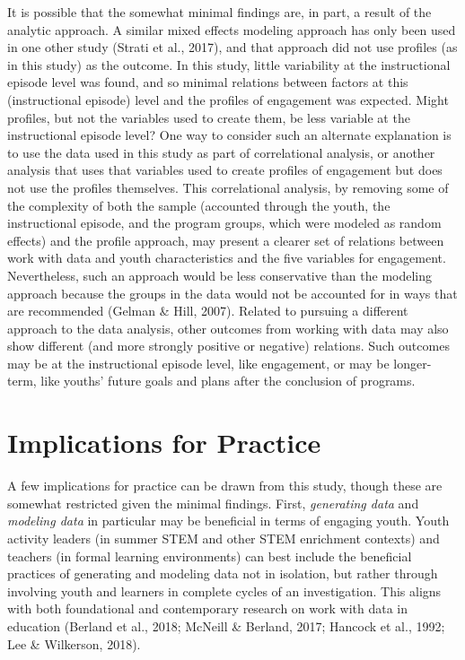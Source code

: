 \documentclass[]{book}
\theoremstyle{definition}
\theoremstyle{definition}
\theoremstyle{definition}
\theoremstyle{remark}
\begin{document}
It is possible that the somewhat minimal findings are, in part, a result
of the analytic approach. A similar mixed effects modeling approach has
only been used in one other study (Strati et al., 2017), and that
approach did not use profiles (as in this study) as the outcome. In this
study, little variability at the instructional episode level was found,
and so minimal relations between factors at this (instructional episode)
level and the profiles of engagement was expected. Might profiles, but
not the variables used to create them, be less variable at the
instructional episode level? One way to consider such an alternate
explanation is to use the data used in this study as part of
correlational analysis, or another analysis that uses that variables
used to create profiles of engagement but does not use the profiles
themselves. This correlational analysis, by removing some of the
complexity of both the sample (accounted through the youth, the
instructional episode, and the program groups, which were modeled as
random effects) and the profile approach, may present a clearer set of
relations between work with data and youth characteristics and the five
variables for engagement. Nevertheless, such an approach would be less
conservative than the modeling approach because the groups in the data
would not be accounted for in ways that are recommended (Gelman \& Hill,
2007). Related to pursuing a different approach to the data analysis,
other outcomes from working with data may also show different (and more
strongly positive or negative) relations. Such outcomes may be at the
instructional episode level, like engagement, or may be longer-term,
like youths' future goals and plans after the conclusion of programs.

\section{Implications for Practice}\label{implications-for-practice}

A few implications for practice can be drawn from this study, though
these are somewhat restricted given the minimal findings. First,
\emph{generating data} and \emph{modeling data} in particular may be
beneficial in terms of engaging youth. Youth activity leaders (in summer
STEM and other STEM enrichment contexts) and teachers (in formal
learning environments) can best include the beneficial practices of
generating and modeling data not in isolation, but rather through
involving youth and learners in complete cycles of an investigation.
This aligns with both foundational and contemporary research on work
with data in education (Berland et al., 2018; McNeill \& Berland, 2017;
Hancock et al., 1992; Lee \& Wilkerson, 2018).
\end{document}
